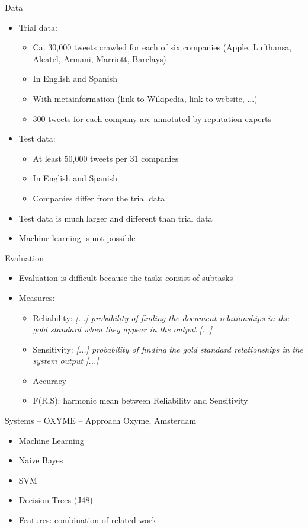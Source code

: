 \documentclass[12pt,a4paper]{beamer}
\begin{document}
\begin{frame}{Data}
\begin{itemize}
\item Trial data:
\begin{itemize}
\item Ca. 30,000 tweets crawled for each of six companies (Apple, Lufthansa, Alcatel, Armani, Marriott, Barclays)
\item In English and Spanish
\item With metainformation (link to Wikipedia, link to website, ...)
\item 300 tweets for each company are annotated by reputation experts
\end{itemize}
\item Test data:
\begin{itemize}
\item At least 50,000 tweets per 31 companies
\item In English and Spanish
\item Companies differ from the trial data
\end{itemize}
\item Test data is much larger and different than trial data
\item Machine learning is not possible
\end{itemize}
\end{frame}


\begin{frame}{Evaluation}
\begin{itemize}
\item Evaluation is difficult because the tasks consist of subtasks
\item Measures:
\begin{itemize}
\item Reliability: \textit{[...] probability of finding the document relationships in the gold standard when they appear in the output [...]} \cite{amigo}
\item Sensitivity: \textit{[...] probability of finding the gold standard relationships in the system output [...]} \cite{amigo}
\item Accuracy
\item F(R,S): harmonic mean between Reliability and Sensitivity
\end{itemize}
\end{itemize}
\end{frame}



\begin{frame}{Systems -- OXYME -- Approach}
Oxyme, Amsterdam \cite{oxyme}
\begin{itemize}
\item Machine Learning
\item Naive Bayes
\item SVM
\item Decision Trees (J48)
\item Features: combination of related work
\end{itemize}

\end{frame}
\end{document}
